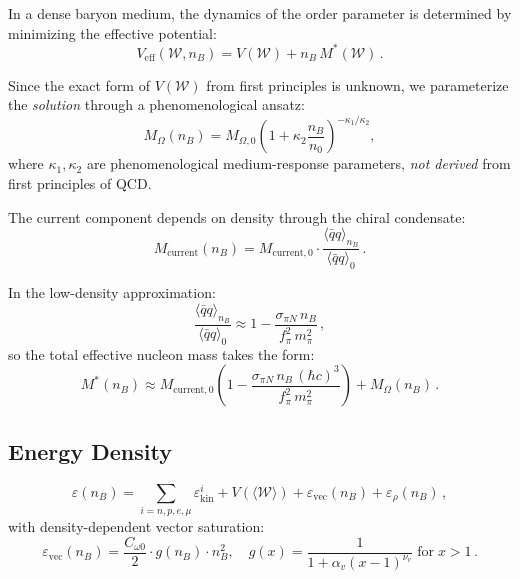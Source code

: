 \documentclass[11pt,a4paper]{article}
\begin{document}
In a dense baryon medium, the dynamics of the order parameter is determined by minimizing the effective potential:
\begin{equation}
V_{\text{eff}}(\mathcal{W}, n_B) = V(\mathcal{W}) + n_B\, M^*(\mathcal{W})\,.
\end{equation}

Since the exact form of $V(\mathcal{W})$ from first principles is unknown, we parameterize the \emph{solution} through a phenomenological ansatz:
\begin{equation}
M_\Omega(n_B) = M_{\Omega,0} \left(1 + \kappa_2 \frac{n_B}{n_0}\right)^{-\kappa_1/\kappa_2},
\label{eq:ansatz}
\end{equation}
where $\kappa_1, \kappa_2$ are phenomenological medium-response parameters, \emph{not derived} from first principles of QCD.

The current component depends on density through the chiral condensate:
\begin{equation}
M_{\text{current}}(n_B) = M_{\text{current},0} \cdot \frac{\langle \bar{q} q \rangle_{n_B}}{\langle \bar{q} q \rangle_0}\,.
\end{equation}

In the low-density approximation:
\begin{equation}
\frac{\langle \bar{q} q \rangle_{n_B}}{\langle \bar{q} q \rangle_0} \approx 1 - \frac{\sigma_{\pi N}\, n_B}{f_\pi^2\, m_\pi^2}\,,
\end{equation}
so the total effective nucleon mass takes the form:
\begin{equation}
M^*(n_B) \approx M_{\text{current},0} \left(1 - \frac{\sigma_{\pi N}\, n_B\, (\hbar c)^3}{f_\pi^2\, m_\pi^2}\right) + M_\Omega(n_B)\,.
\label{eq:mstar}
\end{equation}

\subsection{Energy Density}

\begin{equation}
\varepsilon(n_B) = \sum_{i=n,p,e,\mu} \varepsilon_{\text{kin}}^i + V(\langle \mathcal{W} \rangle) + \varepsilon_{\text{vec}}(n_B) + \varepsilon_{\rho}(n_B)\,,
\end{equation}
with density-dependent vector saturation:
\begin{equation}
\varepsilon_{\text{vec}}(n_B) = \frac{C_{\omega 0}}{2} \cdot g(n_B) \cdot n_B^2, \quad g(x) = \frac{1}{1 + \alpha_v(x-1)^{\nu_v}} \;\text{for}\; x > 1\,.
\end{equation}
\end{document}
